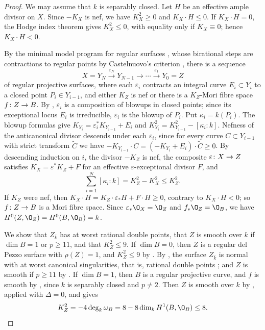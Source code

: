 \begin{proof}
We may assume that $k$ is separably closed.
Let $H$ be an effective ample divisor on $X$.
Since $-K_X$ is nef, we have $K_X^2\geq 0$ and $K_X\cdot H\leq 0$.
If $K_X\cdot H = 0$, the Hodge index theorem gives $K_X^2\leq 0$, with equality only if $K_X\equiv 0$; hence $K_X\cdot H<0$.

By the minimal model program for regular surfaces \cite[Theorem~1.1 and Section~1.2]{Tan18}, whose birational steps are contractions to regular points by Castelnuovo's criterion \cite[Theorem~10.5]{Kol13}, there is a sequence
\[
  X = Y_N\xrightarrow{\varepsilon_N}Y_{N-1}\to\cdots\xrightarrow{\varepsilon_1}Y_0 = Z
\]
of regular projective surfaces, where each $\varepsilon_i$ contracts an integral curve $E_i\subset Y_i$ to a closed point $P_i\in Y_{i-1}$, and either $K_Z$ is nef or there is a $K_Z$-Mori fibre space $f\colon Z\to B$.
By \cite[Tag~]{Stacks}, $\varepsilon_i$ is a composition of blowups in closed points; since its exceptional locus $E_i$ is irreducible, $\varepsilon_i$ is the blowup of $P_i$.
Put $\kappa_i = k(P_i)$.
The blowup formulas give $K_{Y_i} = \varepsilon_i^*K_{Y_{i-1}}+E_i$ and $K_{Y_i}^2 = K_{Y_{i-1}}^2-[\kappa_i:k]$.
Nefness of the anticanonical divisor descends under each $\varepsilon_i$, since for every curve $C\subset Y_{i-1}$ with strict transform $\widetilde C$ we have $-K_{Y_{i-1}}\cdot C = (-K_{Y_i}+E_i)\cdot\widetilde C\geq 0$.
By descending induction on $i$, the divisor $-K_Z$ is nef, the composite $\varepsilon\colon X\to Z$ satisfies $K_X = \varepsilon^*K_Z+F$ for an effective $\varepsilon$-exceptional divisor $F$, and
\begin{equation}\label{eq:nef-K2}
  \sum_{i=1}^N[\kappa_i:k] = K_Z^2-K_X^2\leq K_Z^2.
\end{equation}
If $K_Z$ were nef, then $K_X\cdot H = K_Z\cdot\varepsilon_*H+F\cdot H\geq 0$, contrary to $K_X\cdot H<0$; so $f\colon Z\to B$ is a Mori fibre space.
Since $\varepsilon_*\O_X = \O_Z$ and $f_*\O_Z = \O_B$, we have $H^0(Z,\O_Z) = H^0(B,\O_B) = k$.

We show that $Z_{\bar k}$ has at worst rational double points, that $Z$ is smooth over $k$ if $\dim B = 1$ or $p\geq 11$, and that $K_Z^2\leq 9$.
If $\dim B = 0$, then $Z$ is a regular del Pezzo surface with $\rho(Z) = 1$, and $K_Z^2\leq 9$ by \cite[Theorem~1.8]{Tan24}.
By \cite[Theorem~3.7(1)]{BT22}, the surface $Z_{\bar k}$ is normal with at worst canonical singularities, that is, rational double points \cite[Theorem~2.29 and Example~3.26]{Kol13}; and $Z$ is smooth if $p\geq 11$ by \cite[Proposition~5.2]{BT22}.
If $\dim B = 1$, then $B$ is a regular projective curve, and $f$ is smooth by \cite[Proposition~2.18]{BT22}, since $k$ is separably closed and $p\neq 2$.
Then $Z$ is smooth over $k$ by \cite[Proposition~3.1]{WZ26}, applied with $\Delta = 0$, and \cite[Lemma~2.18]{WZ26} gives
\[
  K_Z^2 = -4\deg_k\omega_B = 8-8\dim_kH^1(B,\O_B)\leq 8.
\]


\end{proof}
